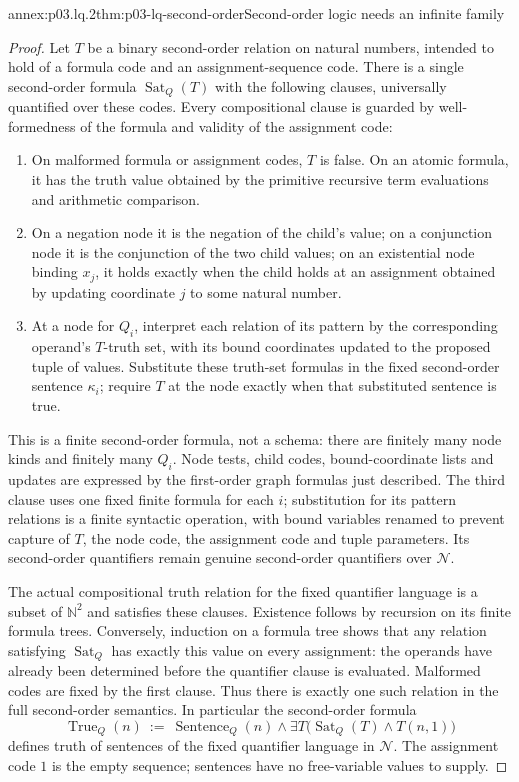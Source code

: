 \begin{annexitem}{annex:p03.lq.2}{thm:p03-lq-second-order}{Second-order logic needs an infinite family}
\begin{proof}
Let \(T\) be a binary second-order relation on natural numbers,
intended to hold of a formula code and an assignment-sequence code.
There is a single second-order formula \(\operatorname{Sat}_Q(T)\)
with the following clauses, universally quantified over these codes.
Every compositional clause is guarded by well-formedness of the formula
and validity of the assignment code:
\begin{enumerate}
 \item On malformed formula or assignment codes, \(T\) is false.
       On an atomic formula, it has the truth value obtained by the
       primitive recursive term evaluations and arithmetic comparison.
 \item On a negation node it is the negation of the child's value;
       on a conjunction node it is the conjunction of the two child
       values; on an existential node binding \(x_j\), it holds
       exactly when the child holds at an assignment obtained by
       updating coordinate \(j\) to some natural number.
 \item At a node for \(Q_i\), interpret each relation of its pattern
       by the corresponding operand's \(T\)-truth set, with its
       bound coordinates updated to the proposed tuple of values.
       Substitute these truth-set formulas in the fixed second-order
       sentence \(\kappa_i\); require \(T\) at the node exactly
       when that substituted sentence is true.
\end{enumerate}
This is a finite second-order formula, not a schema: there are
finitely many node kinds and finitely many \(Q_i\). Node tests,
child codes, bound-coordinate lists and updates are expressed by
the first-order graph formulas just described. The third clause
uses one fixed finite formula for each \(i\); substitution for its
pattern relations is a finite syntactic operation, with bound
variables renamed to prevent capture of \(T\), the node code,
the assignment code and tuple parameters. Its second-order
quantifiers remain genuine second-order quantifiers over \(\mathcal N\).

The actual compositional truth relation for the fixed quantifier
language is a subset of \(\mathbb N^2\) and satisfies these clauses.
Existence follows by recursion on its finite formula trees. Conversely,
induction on a formula tree shows that any relation satisfying
\(\operatorname{Sat}_Q\) has exactly this value on every assignment:
the operands have already been determined before the quantifier
clause is evaluated. Malformed codes are fixed by the first clause.
Thus there is exactly one such relation in the full second-order
semantics. In particular the second-order formula
\[
 \operatorname{True}_Q(n)
   \ :=\ \operatorname{Sentence}_Q(n)\land
       \exists T\bigl(\operatorname{Sat}_Q(T)\land T(n,1)\bigr)
\]
defines truth of sentences of the fixed quantifier language in
\(\mathcal N\). The assignment code \(1\) is the empty sequence;
sentences have no free-variable values to supply.


\end{proof}
\end{annexitem}
